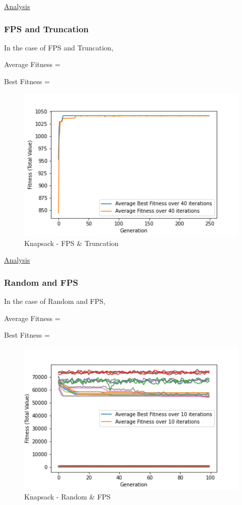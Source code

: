 \documentclass[11pt, letterpaper]{article}
\begin{document}
\underline{Analysis}
\subsubsection {FPS and Truncation}
In the case of FPS and Truncation,

Average Fitness = 

Best Fitness = 
\begin{figure}[H]
    \centering
    \includegraphics[scale = 0.6]{images/knapsack_fp_tr.png}
    \caption {Knapsack - FPS \& Truncation}
    \label {fig:kpFT}
\end{figure}

\underline{Analysis}
\subsubsection {Random and FPS}
In the case of Random and FPS,

Average Fitness = 

Best Fitness = 
\begin{figure}[H]
    \centering
    \includegraphics[scale = 0.6]{images/knapsack_rd_fp.png}
    \caption {Knapsack - Random \& FPS}
    \label {fig:kpRB}
\end{figure}
\end{document}
